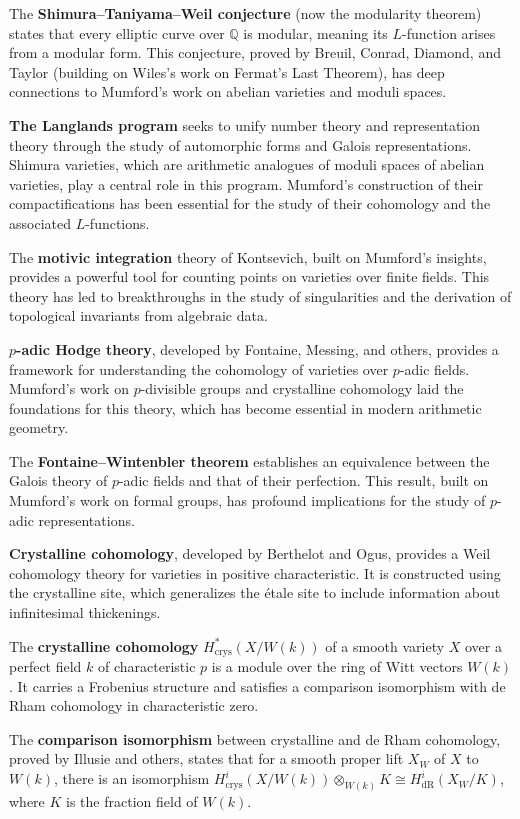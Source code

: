The \textbf{Shimura--Taniyama--Weil conjecture} (now the modularity theorem) states that every elliptic curve over $\mathbb{Q}$ is modular, meaning its $L$-function arises from a modular form. This conjecture, proved by Breuil, Conrad, Diamond, and Taylor (building on Wiles's work on Fermat's Last Theorem), has deep connections to Mumford's work on abelian varieties and moduli spaces.

\textbf{The Langlands program} seeks to unify number theory and representation theory through the study of automorphic forms and Galois representations. Shimura varieties, which are arithmetic analogues of moduli spaces of abelian varieties, play a central role in this program. Mumford's construction of their compactifications has been essential for the study of their cohomology and the associated $L$-functions.

The \textbf{motivic integration} theory of Kontsevich, built on Mumford's insights, provides a powerful tool for counting points on varieties over finite fields. This theory has led to breakthroughs in the study of singularities and the derivation of topological invariants from algebraic data.

\textbf{$p$-adic Hodge theory}, developed by Fontaine, Messing, and others, provides a framework for understanding the cohomology of varieties over $p$-adic fields. Mumford's work on $p$-divisible groups and crystalline cohomology laid the foundations for this theory, which has become essential in modern arithmetic geometry.

The \textbf{Fontaine--Wintenbler theorem} establishes an equivalence between the Galois theory of $p$-adic fields and that of their perfection. This result, built on Mumford's work on formal groups, has profound implications for the study of $p$-adic representations.

\textbf{Crystalline cohomology}, developed by Berthelot and Ogus, provides a Weil cohomology theory for varieties in positive characteristic. It is constructed using the crystalline site, which generalizes the étale site to include information about infinitesimal thickenings.

The \textbf{crystalline cohomology} $H^*_{\text{crys}}(X/W(k))$ of a smooth variety $X$ over a perfect field $k$ of characteristic $p$ is a module over the ring of Witt vectors $W(k)$. It carries a Frobenius structure and satisfies a comparison isomorphism with de Rham cohomology in characteristic zero.

The \textbf{comparison isomorphism} between crystalline and de Rham cohomology, proved by Illusie and others, states that for a smooth proper lift $X_W$ of $X$ to $W(k)$, there is an isomorphism $H^i_{\text{crys}}(X/W(k)) \otimes_{W(k)} K \cong H^i_{\text{dR}}(X_W/K)$, where $K$ is the fraction field of $W(k)$.

